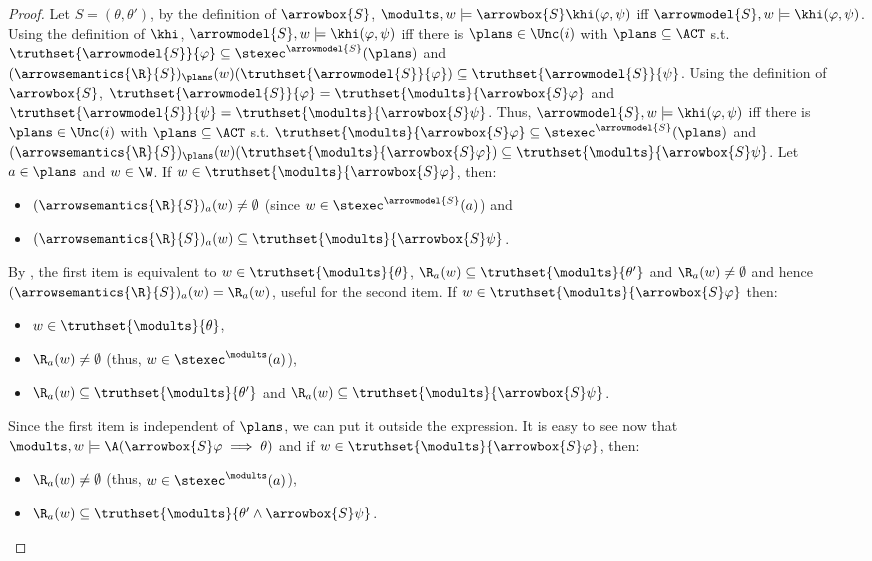 \begin{proof}
	Let $S = (\theta,\theta')$, by the definition of $\arrowbox{S}$, $\modults,w \models \arrowbox{S}\khi(\varphi,\psi)$ iff $\arrowmodel{S},w \models \khi(\varphi,\psi)$.
	Using the definition of $\khi$, $\arrowmodel{S},w \models \khi(\varphi,\psi)$ iff there is $\plans \in \Unc(i)$ with $\plans \subseteq \ACT$ s.t. $\truthset{\arrowmodel{S}}{\varphi} \subseteq \stexec^{\arrowmodel{S}}(\plans)$ and $(\arrowsemantics{\R}{S})_\plans(w)(\truthset{\arrowmodel{S}}{\varphi}) \subseteq \truthset{\arrowmodel{S}}{\psi}$. 
	Using the definition of $\arrowbox{S}$, $\truthset{\arrowmodel{S}}{\varphi} = \truthset{\modults}{\arrowbox{S}\varphi}$ and $\truthset{\arrowmodel{S}}{\psi} = \truthset{\modults}{\arrowbox{S}\psi}$.
	Thus, $\arrowmodel{S},w \models \khi(\varphi,\psi)$ iff there is $\plans \in \Unc(i)$ with $\plans \subseteq \ACT$ s.t. $\truthset{\modults}{\arrowbox{S}\varphi} \subseteq \stexec^{\arrowmodel{S}}(\plans)$ and $(\arrowsemantics{\R}{S})_\plans(w)(\truthset{\modults}{\arrowbox{S}\varphi}) \subseteq \truthset{\modults}{\arrowbox{S}\psi}$.
	Let $a \in \plans$ and $w \in \W$. If $w \in \truthset{\modults}{\arrowbox{S}\varphi}$, then:
	\begin{itemize}
	\item $(\arrowsemantics{\R}{S})_a(w) \neq \emptyset$ (since $w \in \stexec^{\arrowmodel{S}}(a)$) and
	\item $(\arrowsemantics{\R}{S})_a(w) \subseteq \truthset{\modults}{\arrowbox{S}\psi}$.
	\end{itemize}
	By , the first item is equivalent to $w \in \truthset{\modults}{\theta}$, $\R_a(w) \subseteq \truthset{\modults}{\theta'}$ and $\R_a(w) \neq \emptyset$ and hence $(\arrowsemantics{\R}{S})_a(w) = \R_a(w)$, useful for the second item.
	If $w \in \truthset{\modults}{\arrowbox{S}\varphi}$ then:
	\begin{itemize}
	\item $w \in \truthset{\modults}{\theta}$,
	\item $\R_a(w) \neq \emptyset$ (thus, $w \in \stexec^\modults(a)$),
	\item $\R_a(w) \subseteq \truthset{\modults}{\theta'}$ and $\R_a(w) \subseteq \truthset{\modults}{\arrowbox{S}\psi}$.
	\end{itemize}
	Since the first item is independent of $\plans$, we can put it outside the expression.
	It is easy to see now that $\modults,w \models \A(\arrowbox{S}\varphi \implies \theta)$ and if $w \in \truthset{\modults}{\arrowbox{S}\varphi}$, then:
	\begin{itemize}
	\item $\R_a(w) \neq \emptyset$ (thus, $w \in \stexec^\modults(a)$),
	\item $\R_a(w) \subseteq \truthset{\modults}{\theta' \wedge \arrowbox{S}\psi}$.
	\end{itemize}
	

\end{proof}
